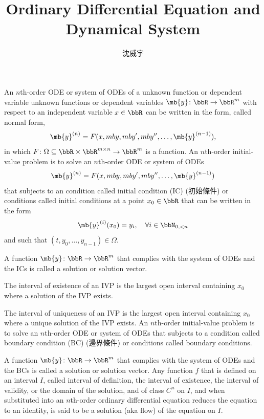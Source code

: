 \documentclass[a4paper,12pt]{report}
\begin{document}
\title{Ordinary Differential Equation and Dynamical System}
\author{沈威宇}
\date{\temtoday}
\titletocdoc
{}
An $n$th-order ODE or system of ODEs of a unknown function or dependent variable unknown functions or dependent variables $\mb{y}\colon\bbR\to\bbR^m$ with respect to an independent variable $x\in\bbR$ can be written in the form, called normal form,
\[\mb{y}^{(n)}=F(x,mb{y},mb{y}',mb{y}'',\ldots,\mb{y}^{(n-1)}),\]
in which $F\colon\Omega\subseteq\bbR\times\bbR^{m\times n}\to\bbR^m$ is a function.
An $n$th-order initial-value problem is to solve an $n$th-order ODE or system of ODEs
\[\mb{y}^{(n)}=F(x,mb{y},mb{y}',mb{y}'',\ldots,\mb{y}^{(n-1)})\]
that subjects to an condition called initial condition (IC) (初始條件) or conditions called initial conditions at a point $x_0\in\bbR$ that can be written in the form
\[\mb{y}^{(i)}(x_0)=y_i,\quad\forall i\in\bbN_{0,<n}\]
and such that $(t,y_0,\ldots,y_{n-1})\in\Omega$.

A function $\mb{y}\colon\bbR\to\bbR^m$ that complies with the system of ODEs and the ICs is called a solution or solution vector.

The interval of existence of an IVP is the largest open interval containing $x_0$ where a solution of the IVP exists.

The interval of uniqueness of an IVP is the largest open interval containing $x_0$ where a unique solution of the IVP exists.
An $n$th-order initial-value problem is to solve an $n$th-order ODE or system of ODEs that subjects to a condition called boundary condition (BC) (邊界條件) or conditions called boundary conditions.

A function $\mb{y}\colon\bbR\to\bbR^m$ that complies with the system of ODEs and the BCs is called a solution or solution vector.
Any function $f$ that is defined on an interval $I$, called interval of definition, the interval of existence, the interval of validity, or the domain of the solution, and of class $C^n$ on $I$, and when substituted into an $n$th-order ordinary differential equation reduces the equation to an identity, is said to be a solution (aka flow) of the equation on $I$.
\end{document}
